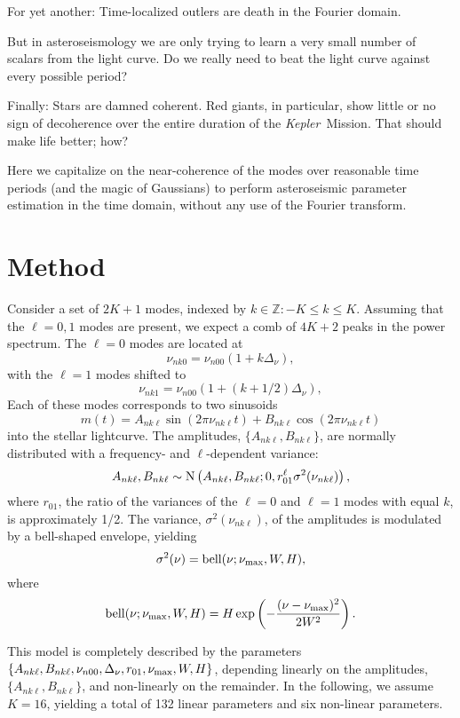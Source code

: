\documentclass[modern]{aastex61}
\newcommand{\project}[1]{\textsl{#1}}
\newcommand{\kepler}{\project{Kepler}}
\newcommand{\normal}{\ensuremath{{\rm N}}}
\newcommand{\nukl}{\ensuremath{\nu_{nk\ell}}}
\newcommand{\nukzero}{\ensuremath{\nu_{nk0}}}
\newcommand{\nukone}{\ensuremath{\nu_{nk1}}}
\newcommand{\nuzero}{\ensuremath{\nu_{n00}}}
\newcommand{\dnu}{\ensuremath{\Delta_\nu}}
\newcommand{\numax}{\ensuremath{\nu_{\rm max}}}
\newcommand{\numod}{\ensuremath{{\rm bell}}}
\newcommand{\amps}{\ensuremath{A_{nk\ell}}}
\newcommand{\ampc}{\ensuremath{B_{nk\ell}}}
\newcommand{\rl}{\ensuremath{r_{01}}}
\begin{document}
For yet another: Time-localized outlers are death in the Fourier domain.

But in asteroseismology we are only trying to learn a very small number
of scalars from the light curve. Do we really need to beat the light curve
against every possible period?

Finally: Stars are damned coherent. Red giants, in particular, show little
or no sign of decoherence over the entire duration of the \kepler\ Mission.
That should make life better; how?

Here we capitalize on the near-coherence of the modes over reasonable
time periods (and the magic of Gaussians) to perform asteroseismic
parameter estimation in the time domain, without any use of the
Fourier transform.

\section{Method}\label{sec:method}

Consider a set of $2K+1$ modes, indexed by $k \in \mathbb{Z}: -K \le k \le K$. Assuming that the $\ell = 0, 1$ modes are present, we expect a comb of $4K+2$ peaks in the power spectrum. The $\ell = 0$ modes are located at
\begin{equation}
\nukzero = \nuzero (1 + k \dnu), 
\end{equation}
with the $\ell = 1$ modes shifted to
\begin{equation}
\nukone = \nuzero (1 + (k + 1/2) \dnu), 
\end{equation}
Each of these modes corresponds to two sinusoids
\begin{equation}
m(t) = \amps \sin(2\pi\nukl t) + \ampc \cos(2\pi\nukl t)
\end{equation}
into the stellar lightcurve. The amplitudes, $\{\amps, \ampc\}$, are normally distributed with a frequency- and $\ell$-dependent variance:
\begin{equation}
\amps, \ampc \sim \normal \left(\amps, \ampc; 0, \rl^\ell \sigma^2(\nukl) \right),
\end{equation}
where $\rl$, the ratio of the variances of the $\ell = 0$ and $\ell = 1$ modes with equal $k$, is approximately 1/2. The variance, $\sigma^2(\nukl)$, of the amplitudes is modulated by a bell-shaped envelope, yielding
\begin{equation}
\sigma^2(\nu) = \numod(\nu; \numax, W, H),
\end{equation}
where
\begin{equation}
\numod(\nu; \numax, W, H) = H \exp \left( -\frac{(\nu - \numax)^2}{2 W^2} \right).
\end{equation}

This model is completely described by the parameters $\{ \amps, \ampc, \nuzero, \dnu, \rl, \numax, W, H \}$, depending linearly on the amplitudes, $\{\amps, \ampc\}$, and non-linearly on the remainder. In the following, we assume $K=16$, yielding a total of 132 linear parameters and six non-linear parameters.
\end{document}
